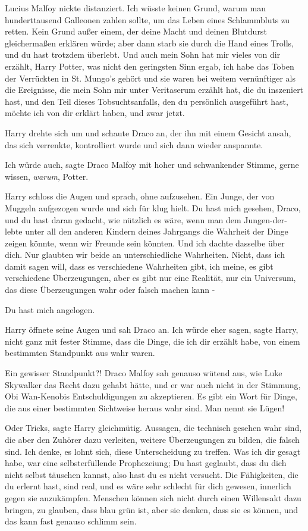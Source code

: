 Lucius Malfoy nickte distanziert. \glqq Ich wüsste keinen Grund, warum man
hunderttausend Galleonen zahlen sollte, um das Leben eines Schlammbluts zu
retten. Kein Grund außer einem, der deine Macht und deinen Blutdurst
gleichermaßen erklären würde; aber dann starb sie durch die Hand eines Trolls,
und du hast trotzdem überlebt. Und auch mein Sohn hat mir vieles von dir
erzählt, Harry Potter, was nicht den geringsten Sinn ergab, ich habe das Toben
der Verrückten in St. Mungo's gehört und sie waren bei weitem vernünftiger als
die Ereignisse, die mein Sohn mir unter Veritaserum erzählt hat, die du
inszeniert hast, und den Teil dieses Tobsuchtsanfalls, den du persönlich
ausgeführt hast, möchte ich von dir erklärt haben, und zwar jetzt.\grqq{}

Harry drehte sich um und schaute Draco an, der ihn mit einem Gesicht ansah, das
sich verrenkte, kontrolliert wurde und sich dann wieder anspannte.

\glqq Ich würde auch\grqq{}, sagte Draco Malfoy mit hoher und schwankender
Stimme, \glqq gerne wissen, \emph{warum}, Potter.\grqq{}

Harry schloss die Augen und sprach, ohne aufzusehen. \glqq Ein Junge, der von
Muggeln aufgezogen wurde und sich für klug hielt. Du hast mich gesehen, Draco,
und du hast daran gedacht, wie nützlich es wäre, wenn man dem Jungen-der-lebte
unter all den anderen Kindern deines Jahrgangs die Wahrheit der Dinge zeigen
könnte, wenn wir Freunde sein könnten. Und ich dachte dasselbe über dich. Nur
glaubten wir beide an unterschiedliche Wahrheiten. Nicht, dass ich damit sagen
will, dass es verschiedene Wahrheiten gibt, ich meine, es gibt verschiedene
Überzeugungen, aber es gibt nur eine Realität, nur ein Universum, das diese
Überzeugungen wahr oder falsch machen kann -\grqq{}

\glqq Du hast mich angelogen.\grqq{}

Harry öffnete seine Augen und sah Draco an. \glqq Ich würde eher sagen\grqq{},
sagte Harry, nicht ganz mit fester Stimme, \glqq dass die Dinge, die ich dir
erzählt habe, von einem bestimmten Standpunkt aus wahr waren.\grqq{}

\glqq Ein gewisser Standpunkt?!\grqq{} Draco Malfoy sah genauso wütend aus, wie
Luke Skywalker das Recht dazu gehabt hätte, und er war auch nicht in der
Stimmung, Obi Wan-Kenobis Entschuldigungen zu akzeptieren. \glqq Es gibt ein
Wort für Dinge, die aus einer bestimmten Sichtweise heraus wahr sind. Man nennt
sie Lügen!\grqq{}

\glqq Oder Tricks\grqq{}, sagte Harry gleichmütig. \glqq Aussagen, die technisch
gesehen wahr sind, die aber den Zuhörer dazu verleiten, weitere Überzeugungen zu
bilden, die falsch sind. Ich denke, es lohnt sich, diese Unterscheidung zu
treffen. Was ich dir gesagt habe, war eine selbsterfüllende Prophezeiung; Du
hast geglaubt, dass du dich nicht selbst täuschen kannst, also hast du es nicht
versucht. Die Fähigkeiten, die du erlernt hast, sind real, und es wäre sehr
schlecht für dich gewesen, innerlich gegen sie anzukämpfen. Menschen können sich
nicht durch einen Willensakt dazu bringen, zu glauben, dass blau grün ist, aber
sie denken, dass sie es können, und das kann fast genauso schlimm sein.\grqq{}

